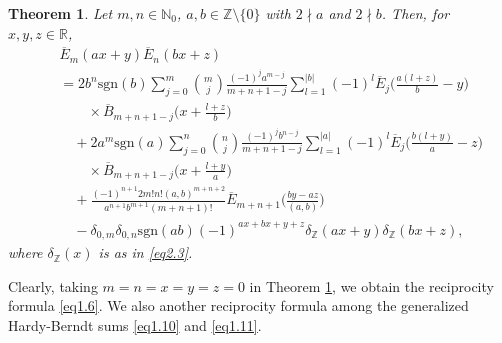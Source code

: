 \documentclass[reqno]{amsart}
\numberwithin{equation}{section}
\newtheorem{theorem}[thm]{Theorem}
\begin{document}
\begin{theorem}\label{thm2.8} Let $m,n\in\mathbb{N}_{0}$, $a,b\in\mathbb{Z}\setminus\{0\}$ with $2\nmid a$ and $2\nmid b$. Then, for $x,y,z\in\mathbb{R}$,
\begin{eqnarray}\label{eq2.20}
&&\overline{E}_{m}(ax+y)\overline{E}_{n}(bx+z)\nonumber\\
&&=2b^{n}\mathrm{sgn}(b)
\sum_{j=0}^{m}\binom{m}{j}\frac{(-1)^{j}a^{m-j}}{m+n+1-j}\sum_{l=1}^{|b|}(-1)^{l}\overline{E}_{j}\biggl(\frac{a(l+z)}{b}-y\biggl)\nonumber\\
&&\qquad\times\overline{B}_{m+n+1-j}\biggl(x+\frac{l+z}{b}\biggl)\nonumber\\
&&\quad+2a^{m}\mathrm{sgn}(a)\sum_{j=0}^{n}\binom{n}{j}\frac{(-1)^{j}b^{n-j}}{m+n+1-j}\sum_{l=1}^{|a|}(-1)^{l}\overline{E}_{j}\biggl(\frac{b(l+y)}{a}-z\biggl)\nonumber\\
&&\qquad\times\overline{B}_{m+n+1-j}\biggl(x+\frac{l+y}{a}\biggl)\nonumber\\
&&\quad+\frac{(-1)^{n+1}2m!n!(a,b)^{m+n+2}}{a^{n+1}b^{m+1}(m+n+1)!}\overline{E}_{m+n+1}\biggl(\frac{by-az}{(a,b)}\biggl)\nonumber\\
&&\quad-\delta_{0,m}\delta_{0,n}\mathrm{sgn}(ab)(-1)^{ax+bx+y+z}\delta_{\mathbb{Z}}(ax+y)\delta_{\mathbb{Z}}(bx+z),
\end{eqnarray}
where $\delta_{\mathbb{Z}}(x)$ is as in \eqref{eq2.3}.
\end{theorem}

Clearly, taking $m=n=x=y=z=0$ in Theorem \ref{thm2.8}, we obtain
the reciprocity formula \eqref{eq1.6}.
We also another reciprocity formula among the generalized Hardy-Berndt sums \eqref{eq1.10} and \eqref{eq1.11}.
\end{document}
